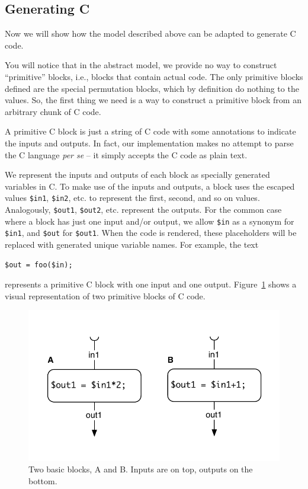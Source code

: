 \subsection{Generating C}
\label{sec:code-gen:c}

Now we will show how the model described above can be adapted to generate C code. 

You will notice that in the abstract model, we provide no way to construct ``primitive'' blocks, i.e., blocks that contain actual code. The only primitive blocks defined are the special permutation blocks, which by definition do nothing to the values. So, the first thing we need is a way to construct a primitive block from an arbitrary chunk of C code.

A primitive C block is just a string of C code with some annotations to indicate the inputs and outputs. In fact, our implementation makes no attempt to parse the C language \emph{per se} -- it simply accepts the C code as plain text.

We represent the inputs and outputs of each block as specially generated variables in C. To make use of the inputs and outputs, a block uses the escaped values \texttt{\$in1}, \texttt{\$in2}, etc. to represent the first, second, and so on values. Analogously, \texttt{\$out1}, \texttt{\$out2}, etc. represent the outputs. For the common case where a block has just one input and/or output, we allow \texttt{\$in} as a synonym for \texttt{\$in1}, and \texttt{\$out} for \texttt{\$out1}. When the code is rendered, these placeholders will be replaced with generated unique variable names. For example, the text 

\begin{verbatim}
$out = foo($in);
\end{verbatim}

represents a primitive C block with one input and one output. Figure~\ref{fig:blocks} shows a visual representation of two primitive blocks of C code.

\begin{figure}[ht]
\centering
\includegraphics[width=0.75\columnwidth]{images/code-gen1}
\caption{Two basic blocks, A and B. Inputs are on top, outputs on the bottom.}
\label{fig:blocks}
\end{figure}

